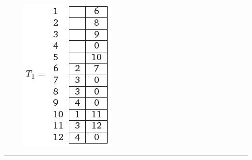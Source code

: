 \documentclass[10pt,a5paper]{book}
\begin{document}
\begin{figure}[H]
{\begin{flushleft}
  \end{flushleft}
}
\hfill
\parbox{2cm}
{
  \begin{flushright}
    \includegraphics[scale=0.6]{tablita.png}
  \end{flushright}
}
\end{figure}
\hrule
\nopagebreak
\end{document}
